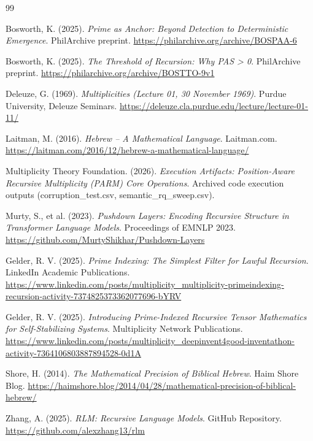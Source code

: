 \documentclass[11pt]{article}
\begin{document}
\begin{thebibliography}{99}

Bosworth, K. (2025).
\textit{Prime as Anchor: Beyond Detection to Deterministic Emergence}.
PhilArchive preprint. \url{https://philarchive.org/archive/BOSPAA-6}

Bosworth, K. (2025).
\textit{The Threshold of Recursion: Why PAS > 0}.
PhilArchive preprint. \url{https://philarchive.org/archive/BOSTTO-9v1}

Deleuze, G. (1969).
\textit{Multiplicities (Lecture 01, 30 November 1969)}.
Purdue University, Deleuze Seminars. \url{https://deleuze.cla.purdue.edu/lecture/lecture-01-11/}

Laitman, M. (2016).
\textit{Hebrew – A Mathematical Language}.
Laitman.com. \url{https://laitman.com/2016/12/hebrew-a-mathematical-language/}

Multiplicity Theory Foundation. (2026).
\textit{Execution Artifacts: Position-Aware Recursive Multiplicity (PARM) Core Operations}.
Archived code execution outputs (corruption\_test.csv, semantic\_rq\_sweep.csv).

Murty, S., et al. (2023).
\textit{Pushdown Layers: Encoding Recursive Structure in Transformer Language Models}.
Proceedings of EMNLP 2023. \url{https://github.com/MurtyShikhar/Pushdown-Layers}

Gelder, R. V. (2025).
\textit{Prime Indexing: The Simplest Filter for Lawful Recursion}.
LinkedIn Academic Publications. \url{https://www.linkedin.com/posts/multiplicity_multiplicity-primeindexing-recursion-activity-7374825373362077696-bYRV}

Gelder, R. V. (2025).
\textit{Introducing Prime-Indexed Recursive Tensor Mathematics for Self-Stabilizing Systems}.
Multiplicity Network Publications. \url{https://www.linkedin.com/posts/multiplicity_deepinvent4good-inventathon-activity-7364106803887894528-0d1A}

Shore, H. (2014).
\textit{The Mathematical Precision of Biblical Hebrew}.
Haim Shore Blog. \url{https://haimshore.blog/2014/04/28/mathematical-precision-of-biblical-hebrew/}

Zhang, A. (2025).
\textit{RLM: Recursive Language Models}.
GitHub Repository. \url{https://github.com/alexzhang13/rlm}

\end{thebibliography}
\end{document}
